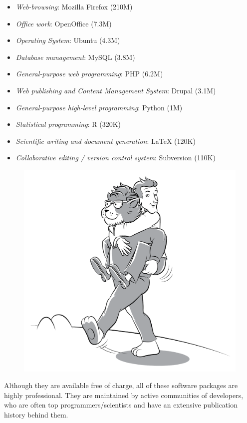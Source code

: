 \documentclass[graybox,envcountchap,sectrefs,UStrade]{svmono}
\begin{document}
\begin{itemize}
  \item \emph{Web-browsing}: \textsf{Mozilla Firefox} (210M)
  \item \emph{Office work}: \textsf{OpenOffice} (7.3M)
  \item \emph{Operating System}: \textsf{Ubuntu} (4.3M)
  \item \emph{Database management}: \textsf{MySQL} (3.8M)
  \item \emph{General-purpose web programming}: \textsf{PHP} (6.2M)
  \item \emph{Web publishing and Content Management System}: \textsf{Drupal} (3.1M)
  \item \emph{General-purpose high-level programming}: \textsf{Python} (1M)
  \item \emph{Statistical programming}: \textsf{R} (320K)
  \item \emph{Scientific writing and document generation}: \textsf{{\LaTeX}} (120K)
  \item \emph{Collaborative editing / version control system}: \textsf{Subversion} (110K)
\end{itemize}

\begin{figure}[!htb]
\begin{center}
  \includegraphics[width=.6\textwidth]{Fig_with_a_bit_of_help_from_TeX.pdf}
\label{Fig_with_a_bit_of_help_from_TeX}
\end{center}
\end{figure}

Although they are available free of charge, all of these software packages are highly professional. They are maintained by active communities of developers, who are often top programmers/scientists and have an extensive publication history behind them.\par
\end{document}
